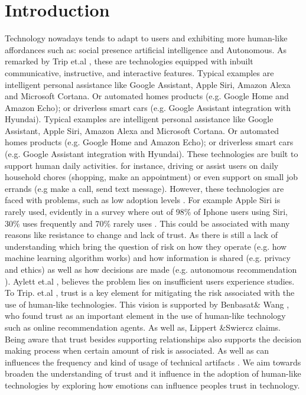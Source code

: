 \section{Introduction}
Technology nowadays tends to adapt to users  \cite{roemmele2016writing:one}\cite{mckee2017professional:two} and exhibiting more human-like affordances such as: social presence \cite{nass1994computers:three} artificial intelligence \cite{mckee2017professional:two}and Autonomous. As remarked by Trip et.al \cite{tripp2011degrees:four}, these are technologies equipped with inbuilt communicative, instructive, and interactive features.
Typical examples are intelligent personal assistance like Google Assistant, Apple Siri, Amazon Alexa and Microsoft Cortana. Or automated homes products (e.g. Google Home and Amazon Echo); or driverless smart cars (e.g. Google Assistant integration with Hyundai).
Typical examples are intelligent personal assistance like Google Assistant, Apple Siri, Amazon Alexa and Microsoft Cortana. Or automated homes products (e.g. Google Home and Amazon Echo); or driverless smart cars (e.g. Google Assistant integration with Hyundai).
These technologies are built to support  human daily activities. for instance,  driving or assist users on daily household  chores (shopping, make an appointment) or even support on small job errands (e.g make a call, send text message)\cite{kamits:five}.
However,  these technologies are faced with problems, such as  low adoption levels \cite{ cowan2017can:six}.  For example Apple Siri is rarely used, evidently in a survey where out of 98\% of Iphone users using Siri, 30\%  uses frequently and 70\% rarely uses \cite{factor1:seven}. This could be associated with many reasons like resistance to change and lack of trust. As there is still a lack of understanding which bring the question of risk on how they operate (e.g. how machine learning algorithm works) and how information is shared (e.g. privacy and ethics) as well as how decisions are made (e.g. autonomous recommendation ).
Aylett et.al \cite{aylett2014none:eight}, believes the problem lies on insufficient users experience studies.  To Trip. et.al \cite{tripp2011degrees:four},  trust is a key element for mitigating the risk associated with the use of human-like technologies.  This vision is supported by Benbasat\& Wang \cite{benbasat2005trust:nine}, who found trust  as an important element in the use of  human-like technology such as online recommendation agents. As well as, Lippert \&Swiercz \cite{lippert2007personal:ten} claims.  
Being aware that trust besides supporting relationships also supports the decision making process when certain amount of risk is associated. As well as can influences the frequency and kind of usage of technical artifacts \cite{nothdurft2013bases:eleven}. We aim towards broaden the understanding of trust and it influence in the adoption of human-like technologies by  exploring how emotions can influence peoples trust in technology. 
